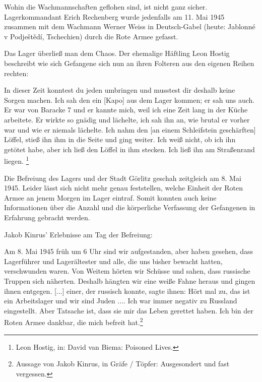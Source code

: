 \documentclass[a4paper,12pt,ngerman,
]{nisebook}
\begin{document}
\newpage
Wohin die Wachmannschaften geflohen sind, ist nicht ganz sicher. Lagerkommandant Erich Rechenberg wurde jedenfalls am 11. Mai 1945 zusammen mit dem Wachmann Werner Weiss in Deutsch-Gabel (heute: Jablonné v Podještědí, Tschechien) durch die Rote Armee gefasst.\newline

Das Lager überließ man dem Chaos. Der ehemalige Häftling Leon Hostig beschreibt wie sich Gefangene sich nun an ihren Folteren aus den eigenen Reihen rechten:
\begin{leftbar} 
In dieser Zeit konntest du jeden umbringen und musstest dir deshalb keine Sorgen machen. Ich sah den ein [Kapo] aus dem Lager kommen; er sah uns auch. Er war von Baracke 7 und er kannte mich, weil ich eine Zeit lang in der Küche arbeitete. Er wirkte so gnädig und lächelte, ich sah ihn an, wie brutal er vorher war und wie er niemals lächelte. Ich nahm den [an einem Schleifstein geschärften] Löffel, stieß ihn ihm in die Seite und ging weiter. Ich weiß nicht, ob ich ihn getötet habe, aber ich ließ den Löffel in ihm stecken. Ich ließ ihn am Straßenrand liegen. 
\footnote{Leon Hostig, in: David van Biema: Poisoned Lives.}
\end{leftbar} 

Die Befreiung des Lagers und der Stadt Görlitz geschah zeitgleich am 8. Mai 1945. Leider lässt sich nicht mehr genau feststellen, welche Einheit der Roten Armee an jenem Morgen im Lager eintraf. Somit konnten auch keine Informationen über die Anzahl und die körperliche Verfassung der Gefangenen in Erfahrung gebracht werden.\newline

Jakob Kinrus' Erlebnisse am Tag der Befreiung:
\begin{leftbar} 
Am 8. Mai 1945 früh um 6 Uhr sind wir aufgestanden, aber haben gesehen, dass Lagerführer und Lagerältester und alle, die uns bisher bewacht hatten, verschwunden waren. Von Weitem hörten wir Schüsse und sahen, dass russische Truppen sich näherten. Deshalb hängten wir eine weiße Fahne heraus und gingen ihnen entgegen. [...] einer, der russisch konnte, sagte ihnen: \glqq Hört mal zu, das ist ein Arbeitslager und wir sind Juden ...\grqq. Ich war immer negativ zu Russland eingestellt. Aber Tatsache ist, dass sie mir das Leben gerettet haben. Ich bin der Roten Armee dankbar, die mich befreit hat.\footnote{Aussage von Jakob Kinrus, in Gräfe / Töpfer: Ausgesondert und fast vergessen.}
\end{leftbar}
\end{document}
